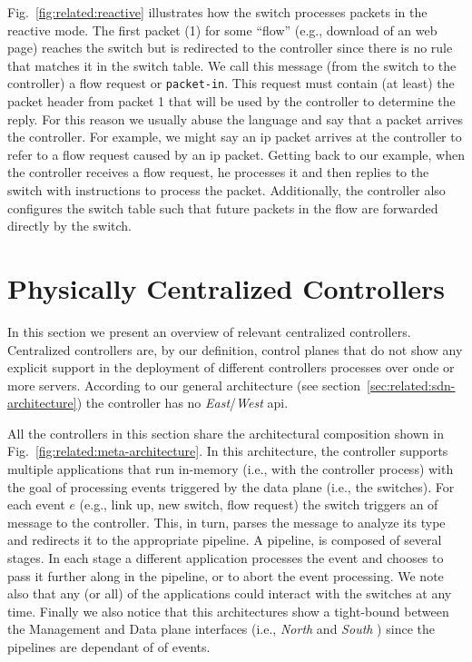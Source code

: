 Fig.~\ref{fig:related:reactive} illustrates how the switch processes packets in the reactive mode. 
The first packet (1) for some ``flow'' (e.g., download of an web page)  reaches the switch but is redirected to the controller since there is no rule that matches it in  the switch table. 
We call this message (from the switch to the controller)  a flow request or \texttt{packet-in}. 
This request must contain (at least) the packet header from packet 1 that will be used by the controller to determine the reply. 
For this reason we usually abuse the language and say that a packet arrives the controller. 
For example, we might say an \gls{ip} packet arrives at the controller to refer to a flow request caused by an \gls{ip} packet. 
Getting back to our example, when the controller receives a flow request, he processes it  and then replies to the switch with instructions to process the packet. 
Additionally, the controller also configures the switch table such that  future packets in the flow are forwarded directly by the switch. 



\glsresetall

\section{Physically Centralized Controllers}
\label{sec:related:phys-centr-contr}
\glsresetall


In this section we present an overview of relevant centralized
controllers. Centralized controllers are, by our definition, control
planes that do not show any explicit support in the deployment of 
different controllers processes over onde or more servers. 
According to our general architecture (see section~\ref{sec:related:sdn-architecture}) the controller has no \emph{East}/\emph{West} \gls{api}. 

All the controllers in this section share the architectural composition shown in Fig.~\ref{fig:related:meta-architecture}.
In this architecture, the controller supports multiple applications that run in-memory (i.e., with the controller process) with the goal of processing events  triggered by the data plane (i.e., the switches). 
For each event $e$ (e.g., link up, new switch, flow request) the switch triggers an \gls{of} message to the controller. 
This, in turn, parses  the message to analyze its type and redirects it to the appropriate pipeline. 
A pipeline, is composed of several stages. 
In each stage a different application processes the event and chooses to pass it further along in the pipeline, or to abort the event processing. 
We note also that any (or all) of the applications could interact with the switches at any time. 
Finally we also notice that this architectures  show a tight-bound between the Management and Data plane interfaces (i.e., \emph{North} and \emph{South} ) since the pipelines are dependant of \gls{of} events. 

